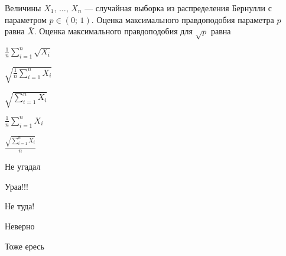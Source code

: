 
\begin{question}
Величины \(X_1, \, \ldots, \, X_n\) --- случайная выборка из
распределения Бернулли с параметром \(p \in (0;\,1)\). Оценка
максимального правдоподобия параметра \(p\) равна \(\bar X\). Оценка
максимального правдоподобия для \(\sqrt{p}\) равна
\begin{answerlist}
  \item \(\frac{1}{n}\sum_{i=1}^{n}\sqrt{X_i}\)
  \item \(\sqrt{\frac{1}{n}\sum_{i=1}^{n}X_i}\)
  \item \(\sqrt{\sum_{i=1}^{n}X_i}\)
  \item \(\frac{1}{n}\sum_{i=1}^{n}X_i\)
  \item \(\frac{\sqrt{\sum_{i=1}^{n}X_i}}{n}\)
\end{answerlist}
\end{question}

\begin{solution}
\begin{answerlist}
  \item Не угадал
  \item Ураа!!!
  \item Не туда!
  \item Неверно
  \item Тоже ересь
\end{answerlist}
\end{solution}

